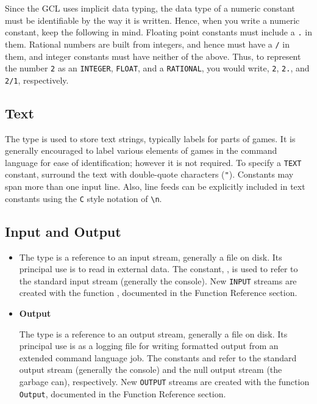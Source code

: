 Since the GCL uses implicit data typing, the data type of a numeric
constant must be identifiable by the way it is written.  Hence, when
you write a numeric constant, keep the following in mind.  Floating
point constants must include a \verb+.+ in them.  Rational numbers are
built from integers, and hence must have a \verb+/+ in them, and
integer constants must have neither of the above. Thus, to represent
the number \verb+2+ as an \verb+INTEGER+, \verb+FLOAT+, and a
\verb+RATIONAL+, you would write, \verb+2+, \verb+2.+, and \verb+2/1+,
respectively.

\subsection{Text}

The  type is used to store text strings, typically labels
for parts of games.  It is generally encouraged to label various
elements of games in the command language for ease of identification;
however it is not required.  To specify a {\tt TEXT} constant,
surround the text with double-quote characters ({\tt "}).  Constants
may span more than one input line.  Also, line feeds can be explicitly
included in text constants using the \verb+C+ style notation of
\verb+\n+. 

\subsection{Input and Output}

\begin{itemize}
\item{}

The  type is a reference to an input stream, generally a
file on disk.  Its principal use is to read in external data.  The
constant, , is used to refer to the standard input stream
(generally the console).  New \verb+INPUT+ streams are created with
the function , documented in the Function Reference
section.

\item {\bf Output}

The  type is a reference to an output stream, generally a
file on disk.  Its principal use is as a logging file for writing
formatted output from an extended command language job.  The
constants  and  refer to the standard
output stream (generally the console) and the null output stream (the
garbage can), respectively.  New \verb+OUTPUT+ streams are created with the 
function \verb+Output+, documented in the Function Reference section.
\end{itemize}

